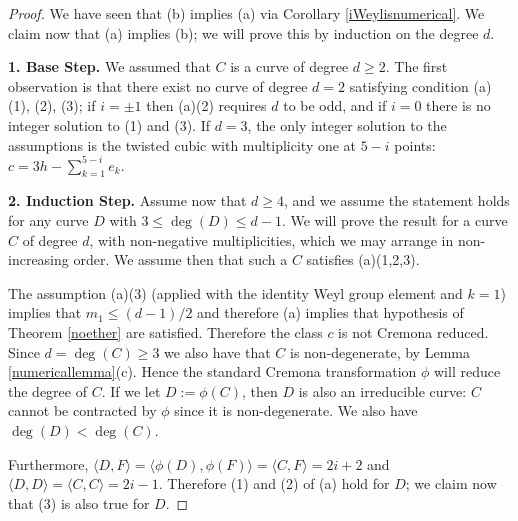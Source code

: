 \documentclass[12pt]{article}
\numberwithin{equation}{section}
\numberwithin{equation}{section}
\numberwithin{subeq}{equation}
\begin{document}
\begin{proof}
We have seen that (b) implies (a)
via Corollary \ref{iWeylisnumerical}.
We claim now that (a) implies (b); we will prove this by induction on the degree $d$.
	
{\bf 1. Base Step.} We assumed that $C$ is a curve of degree $d \geq 2$.
The first observation is that there exist no curve of degree $d=2$
satisfying condition (a) (1), (2), (3);
if $i=\pm 1$ then (a)(2) requires $d$ to be odd,
and if $i=0$ there is no integer solution to (1) and (3).
If $d=3$, the only integer solution to the assumptions
is the twisted cubic with multiplicity one at $5-i$ points:
$c=3h-\sum_{k=1}^{5-i} e_k$.
	
{\bf 2. Induction Step.} Assume now that $d \geq 4$,
and we assume the statement holds for any curve $D$ 
with $3\leq \deg(D) \leq d-1$.
We will prove the result for a curve $C$ of degree $d$,
with non-negative multiplicities, which we may arrange in non-increasing order.
We assume then that such a $C$ satisfies (a)(1,2,3).

The assumption (a)(3) (applied with the identity Weyl group element and $k=1$) 
implies that $m_1\leq (d-1)/2$
and therefore (a) implies that hypothesis of Theorem \ref{noether} are satisfied.
Therefore the class $c$ is not Cremona reduced.
Since $d=\deg(C) \geq 3$ we also have that $C$ is non-degenerate, by Lemma \ref{numericallemma}(c).
Hence the standard Cremona transformation $\phi$ will reduce the degree of $C$.
If we let $D:=\phi(C)$, then $D$ is also an irreducible curve:
$C$ cannot be contracted by $\phi$ since it is non-degenerate.
We also have $\deg(D) < \deg(C)$.

Furthermore,
$\langle D, F \rangle = \langle \phi(D), \phi(F) \rangle = \langle C,F\rangle = 2i+2 $
and
$\langle D, D \rangle= \langle C, C \rangle= 2i-1$.
Therefore (1) and (2) of (a) hold for $D$;
we claim now that (3) is also true for $D$.


\end{proof}
\end{document}
